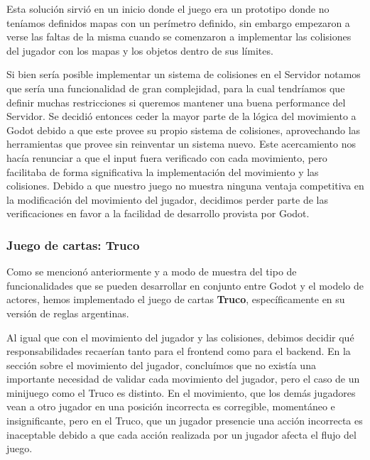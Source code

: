 Esta solución sirvió en un inicio donde el juego era un prototipo donde no teníamos definidos 
mapas con un perímetro definido, sin embargo empezaron a verse las faltas de la misma cuando 
se comenzaron a implementar las colisiones del jugador con los mapas y los objetos dentro de sus límites.

Si bien sería posible implementar un sistema de colisiones en el Servidor notamos que sería una funcionalidad
de gran complejidad, para la cual tendríamos que definir muchas restricciones si queremos mantener una buena
performance del Servidor.
Se decidió entonces ceder la mayor parte de la lógica del movimiento a Godot debido a que este provee 
su propio sistema de colisiones, aprovechando las herramientas que provee sin reinventar un sistema 
nuevo. Este acercamiento nos hacía renunciar a que el input fuera 
verificado con cada movimiento, pero facilitaba de forma significativa la implementación del 
movimiento y las colisiones. Debido a que nuestro juego no muestra ninguna ventaja competitiva 
en la modificación del movimiento del jugador, decidimos perder parte de las verificaciones en 
favor a la facilidad de desarrollo provista por Godot.

\subsubsection{Juego de cartas: Truco}
\noindent Como se mencionó anteriormente y a modo de muestra del tipo de funcionalidades que se pueden
desarrollar en conjunto entre Godot y el modelo de actores, hemos implementado el juego de cartas \textbf{Truco},
específicamente en su versión de reglas argentinas.

Al igual que con el movimiento del jugador y las colisiones, debimos decidir qué 
responsabilidades recaerían tanto para el frontend como para el backend. En la sección 
sobre el movimiento del jugador, concluímos que no existía una importante necesidad de 
validar cada movimiento del jugador, pero el caso de un minijuego como el Truco es distinto. 
En el movimiento, que los demás jugadores vean a otro jugador en una posición incorrecta es 
corregible, momentáneo e insignificante, pero en el Truco, que un jugador presencie una acción 
incorrecta es inaceptable debido a que cada acción realizada por un jugador afecta el flujo del juego.

